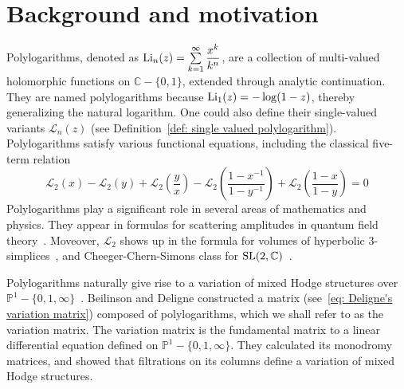\section{Background and motivation}

Polylogarithms, denoted as $\operatorname{Li}_n(z)=\sum\limits_{k=1}^\infty\dfrac{x^k}{k^n}$, are a collection of multi-valued holomorphic functions on $\mathbb C-\{0,1\}$, extended through analytic continuation. They are named polylogarithms because $\operatorname{Li}_1(z)=-\log(1-z)$, thereby generalizing  the natural logarithm. One could also define their single-valued variants $\mathcal L_n(z)$ (see Definition~\ref{def: single valued polylogarithm}). Polylogarithms satisfy various functional equations, including the classical five-term relation
\begin{equation}\label{eq: five term relation}
\mathcal L_2(x)-\mathcal L_2(y)+\mathcal L_2\left(\frac{y}{x}\right)-\mathcal L_2\left(\frac{1-x^{-1}}{1-y^{-1}}\right)+\mathcal L_2\left(\frac{1-x}{1-y}\right)=0
\end{equation}
Polylogarithms play a significant role 
in several areas of mathematics and physics. They appear in formulas for scattering amplitudes in quantum field theory~\cite{golden_clusterPolylogarithmsForScattering}. Moveover, $\mathcal L_2$ shows up in the formula for volumes of hyperbolic $3$-simplices~\cite{Zagier_TheDilogarithm}, and Cheeger-Chern-Simons class for $\operatorname{SL}(2,\mathbb C)$~\cite{zickert_dilogarithmCCCclass}.

Polylogarithms naturally give rise to a variation of mixed Hodge structures over $\mathbb P^1-\{0,1,\infty\}$~\cite{Deligne_InterpretationMotiviqueDeLaConjectureDeZagierReliantPolylogarithmesEtRegulateurs}. Beilinson and Deligne constructed a matrix (see~\ref{eq: Deligne's variation matrix}) composed of polylogarithms, which we shall refer to as the variation matrix. The variation matrix is the fundamental matrix to a linear differential equation defined on $\mathbb P^1-\{0,1,\infty\}$. They calculated its monodromy matrices, and showed that filtrations on its columns define a variation of mixed Hodge structures.

